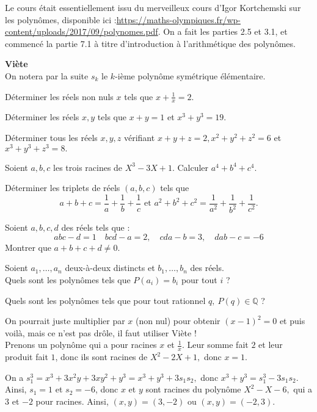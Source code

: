 Le cours était essentiellement issu du merveilleux cours d'Igor Kortchemski sur les polynômes, disponible ici :\url{https://maths-olympiques.fr/wp-content/uploads/2017/09/polynomes.pdf}. On a fait les parties 2.5 et 3.1, et commencé la partie 7.1 à titre d'introduction à l'arithmétique des polynômes.

\textbf{Viète}\\
On notera par la suite $s_k$ le $k$-ième polynôme symétrique élémentaire.
\begin{exo}
Déterminer les réels non nuls $x$ tels que $x+\frac1x=2.$
\end{exo}
\begin{exo}
Déterminer les réels $x,y$ tels que $x+y=1$ et $x^3+y^3=19$.
\end{exo}
\begin{exo}
Déterminer tous les réels $x,y,z$ vérifiant $x+y+z=2,x^2+y^2+z^2=6$ et $x^3+y^3+z^3=8.$
\end{exo}
\begin{exo}
Soient $a,b,c$ les trois racines de $X^3-3X+1$. Calculer $a^4+b^4+c^4$.
\end{exo}
\begin{exo}
Déterminer les triplets de réels $(a,b,c)$ tels que $$a+b+c=\frac1a+\frac1b+\frac1c\text{ et }a^2+b^2+c^2= \frac1{a^2}+\frac1{b^2}+\frac1{c^2}.$$
\end{exo}
\begin{exo}
Soient $a,b,c,d$ des réels tels que :
$$abc-d=1\quad bcd-a=2,\quad cda-b=3,\quad dab-c=-6$$Montrer que $a+b+c+d\ne 0.$
\end{exo}
\begin{exo}
Soient $a_1,\ldots,a_n$ deux-à-deux distincts et $b_1,\ldots,b_n$ des réels.\\Quels sont les polynômes tels que $P(a_i)=b_i$ pour tout $i$ ?
\end{exo}
\begin{exo}
Quels sont les polynômes tels que pour tout rationnel $q,\:P(q)\in\mathbb Q$ ?
\end{exo}
\begin{sol}
On pourrait juste multiplier par $x$ (non nul) pour obtenir $(x-1)^2=0$ et puis voilà, mais ce n'est pas drôle, il faut utiliser Viète !\\
Prenons un polynôme qui a pour racines $x$ et $\frac 1x.$ Leur somme fait $2$ et leur produit fait $1$, donc ils sont racines de $X^2-2X+1,$ donc $x=1.$
\end{sol}
\begin{sol}
On a $s_1^3=x^3+3x^2y+3xy^2+y^3=x^3+y^3+3s_1s_2,$ donc $x^3+y^3=s_1^3-3s_1s_2$. Ainsi, $s_1=1$ et $s_2=-6$, donc $x$ et $y$ sont racines du polynôme $X^2-X-6,$ qui a $3$ et $-2$ pour racines. Ainsi, $(x,y)=(3,-2)$ ou $(x,y)=(-2,3)$.
\end{sol}
